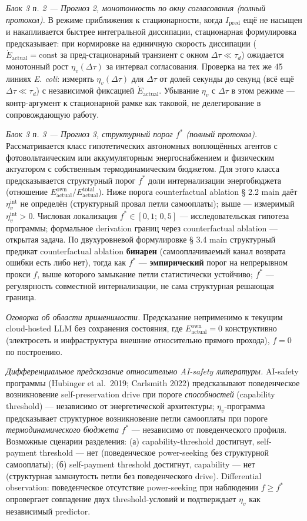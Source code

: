 \documentclass[pdflatex,sn-mathphys-ay]{sn-jnl}
\begin{document}
\emph{Блок 3 п. 2 --- Прогноз 2, монотонность по окну согласования (полный протокол).} В режиме приближения к стационарности, когда \(I_{\text{pred}}\) ещё не насыщен и накапливается быстрее интегральной диссипации, стационарная формулировка предсказывает: при нормировке на единичную скорость диссипации (\(\dot{E}_{\text{actual}} = \text{const}\) за пред-стационарный транзиент с окном \(\Delta\tau \ll \tau_d\)) ожидается монотонный рост \(\eta_v(\Delta\tau)\) за интервал согласования. Проверка на тех же 45 линиях \emph{E. coli}: измерять \(\eta_v(\Delta\tau)\) для \(\Delta\tau\) от долей секунды до секунд (всё ещё \(\Delta\tau \ll \tau_d\)) с независимой фиксацией \(\dot{E}_{\text{actual}}\). Убывание \(\eta_v\) с \(\Delta\tau\) в этом режиме --- контр-аргумент к стационарной рамке как таковой, не делегирование в сопровождающую работу.

\emph{Блок 3 п. 3 --- Прогноз 3, структурный порог \(f^*\) (полный протокол).} Рассматривается класс гипотетических автономных воплощённых агентов с фотовольтаическим или аккумуляторным энергоснабжением и физическим актуатором с собственным термодинамическим бюджетом. Для этого класса предсказывается структурный порог \(f^*\) доли интернализации энергобюджета (отношение \(E_{\text{actual}}^{\text{own}}/E_{\text{actual}}^{\text{total}}\)). Ниже порога counterfactual ablation § 2.2 main даёт \(\eta_v^{\text{int}}\) не определён (структурный провал петли самооплаты); выше --- измеримый \(\eta_v^{\text{int}} > 0\). Числовая локализация \(f^* \in [0{,}1;\, 0{,}5]\) --- исследовательская гипотеза программы; формальное derivation границ через counterfactual ablation --- открытая задача. По двухуровневой формулировке § 3.4 main структурный предикат counterfactual ablation \textbf{бинарен} (самооплачиваемый канал возврата ошибки есть либо нет), тогда как \(f^*\) --- \textbf{эмпирический} порог на непрерывном прокси \(f\), выше которого замыкание петли статистически устойчиво; \(f^*\) --- регулярность совместной интернализации, не сама структурная решающая граница.

\emph{Оговорка об области применимости.} Предсказание неприменимо к текущим cloud-hosted LLM без сохранения состояния, где \(E_{\text{actual}}^{\text{own}} = 0\) конструктивно (электросеть и инфраструктура внешние относительно прямого прохода), \(f = 0\) по построению.

\emph{Дифференциальное предсказание относительно AI-safety литературы.} AI-safety программы (Hubinger et al.~2019; Carlsmith 2022) предсказывают поведенческое возникновение self-preservation drive при пороге \emph{способностей} (capability threshold) --- независимо от энергетической архитектуры; \(\eta_v\)-программа предсказывает структурное возникновение петли самооплаты при пороге \emph{термодинамического бюджета} \(f^*\) --- независимо от поведенческого профиля. Возможные сценарии разделения: (а) capability-threshold достигнут, self-payment threshold --- нет (поведенческое power-seeking без структурной самооплаты); (б) self-payment threshold достигнут, capability --- нет (структурная замкнутость петли без поведенческого drive). Differential observation: поведенческое отсутствие power-seeking при наблюдении \(f \ge f^*\) опровергает совпадение двух threshold-условий и подтверждает \(\eta_v\) как независимый predictor.
\end{document}
